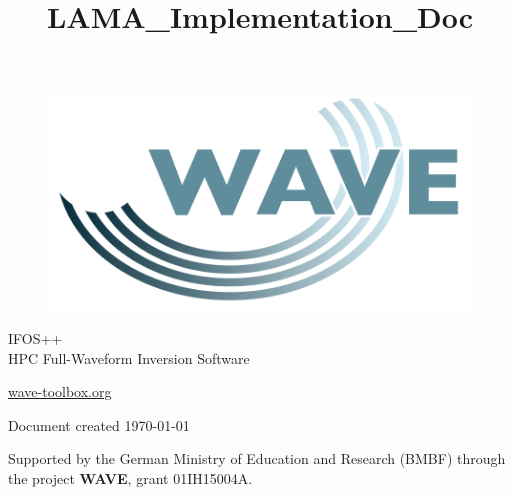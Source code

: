 \documentclass[pdftex,a4paper,parskip,listof=totoc,bibliography=totoc,onehalfspacing,12pt]{scrreprt}
\title{LAMA_Implementation_Doc}
\author{}
\begin{document}



\thispagestyle{empty} %
\begin{figure}[h] %
\begin{flushright}
\includegraphics[scale=0.15]{./images/wave_logo.png}
\end{flushright}
\end{figure}

\begin{center}
\vspace{2cm}
\huge{IFOS++}\\
\vspace{0.5cm}
\large{HPC Full-Waveform Inversion Software}
\end{center}

\vfill
\begin{center}
{\Large{\url{wave-toolbox.org}}}


{\small Document created \today}
\end{center}

\newpage 
\thispagestyle{empty}
\begin{center}
{\large
Supported by the German Ministry of Education and Research (BMBF) through the project \textbf{WAVE}, grant 01IH15004A.
}
\end{center}

\cleardoublepage

\setcounter{page}{1}
\restoregeometry


\newpage
\end{document}
